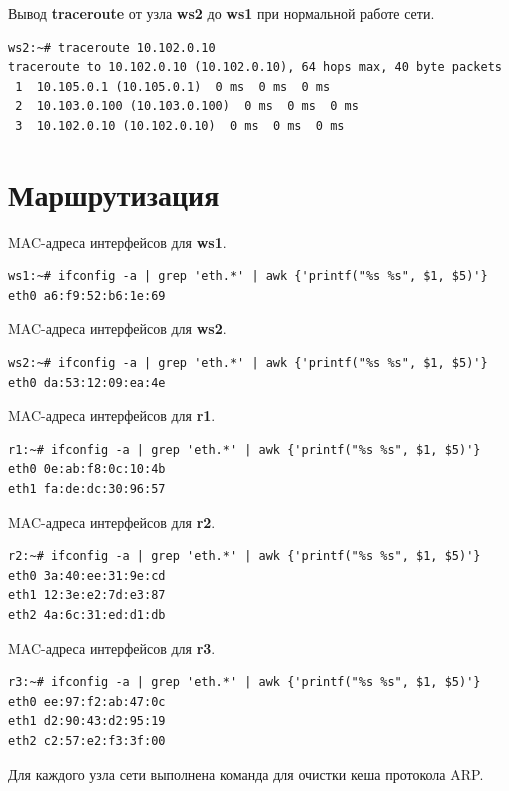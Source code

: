 \documentclass[a4paper,12pt]{article}
\begin{document}
Вывод \textbf{traceroute} от узла \textbf{ws2} до \textbf{ws1} при нормальной работе сети.

\begin{Verbatim}
ws2:~# traceroute 10.102.0.10
traceroute to 10.102.0.10 (10.102.0.10), 64 hops max, 40 byte packets
 1  10.105.0.1 (10.105.0.1)  0 ms  0 ms  0 ms
 2  10.103.0.100 (10.103.0.100)  0 ms  0 ms  0 ms
 3  10.102.0.10 (10.102.0.10)  0 ms  0 ms  0 ms
\end{Verbatim}


\section{Маршрутизация}

MAC-адреса интерфейсов для \textbf{ws1}.

\begin{Verbatim}
ws1:~# ifconfig -a | grep 'eth.*' | awk {'printf("%s %s", $1, $5)'}
eth0 a6:f9:52:b6:1e:69
\end{Verbatim}

MAC-адреса интерфейсов для \textbf{ws2}.

\begin{Verbatim}
ws2:~# ifconfig -a | grep 'eth.*' | awk {'printf("%s %s", $1, $5)'}
eth0 da:53:12:09:ea:4e
\end{Verbatim}

MAC-адреса интерфейсов для \textbf{r1}.

\begin{Verbatim}
r1:~# ifconfig -a | grep 'eth.*' | awk {'printf("%s %s", $1, $5)'}
eth0 0e:ab:f8:0c:10:4b
eth1 fa:de:dc:30:96:57
\end{Verbatim}

MAC-адреса интерфейсов для \textbf{r2}.

\begin{Verbatim}
r2:~# ifconfig -a | grep 'eth.*' | awk {'printf("%s %s", $1, $5)'}
eth0 3a:40:ee:31:9e:cd
eth1 12:3e:e2:7d:e3:87
eth2 4a:6c:31:ed:d1:db
\end{Verbatim}

MAC-адреса интерфейсов для \textbf{r3}.

\begin{Verbatim}
r3:~# ifconfig -a | grep 'eth.*' | awk {'printf("%s %s", $1, $5)'}
eth0 ee:97:f2:ab:47:0c
eth1 d2:90:43:d2:95:19
eth2 c2:57:e2:f3:3f:00
\end{Verbatim}

Для каждого узла сети выполнена команда для очистки кеша протокола ARP.
\end{document}
